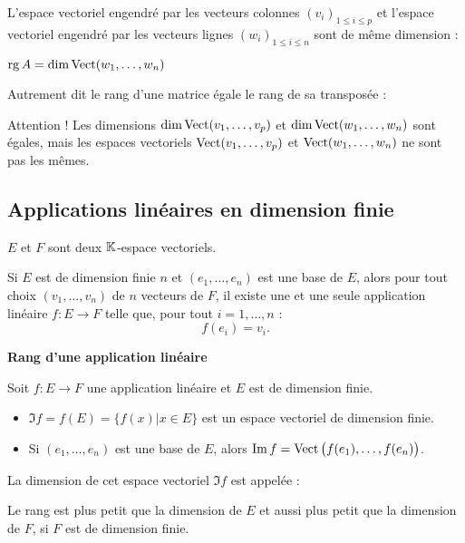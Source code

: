 \documentclass[10pt,class=article,crop=false]{standalone}
\begin{document}
\begin{multicols}{2}
L'espace vectoriel engendré par les vecteurs colonnes $(v_i)_{1 \le i \le p}$
	et l'espace vectoriel engendré par les vecteurs lignes $(w_i)_{1 \le i \le n}$ sont de même dimension :
\begin{proposition}
	$\operatorname{rg} A = \dim \operatorname{Vect} (w_1,\ldots,w_n)$
\end{proposition}

Autrement dit le rang d'une matrice égale le rang de sa transposée :

Attention ! Les dimensions $\dim \operatorname{Vect} (v_1,\ldots,v_p)$ et $\dim \operatorname{Vect} (w_1,\ldots,w_n)$
sont égales, mais les espaces vectoriels $\operatorname{Vect} (v_1,\ldots,v_p)$ et $\operatorname{Vect} (w_1,\ldots,w_n)$
ne sont pas les mêmes.


\subsection{Applications linéaires en dimension finie}

$E$ et $F$ sont deux $\mathbb{K}$-espace vectoriels.

\begin{theoreme}
Si $E$ est de dimension finie $n$
et $(e_1,\dots,e_n)$ est une base de $E$,
alors pour tout choix $(v_1, \ldots ,v_n)$
de $n$ vecteurs de $F$, il existe une et une seule application linéaire $f : E \to F$
telle que, pour tout $i=1,\ldots,n$ :
$$f(e_i)=v_i.$$
\end{theoreme}

\textbf{Rang d'une application linéaire}

Soit $f : E \to F$ une application linéaire et $E$ est de dimension finie.
\begin{itemize}
	\item $\Im f = f(E) = \big\{ f(x) | x \in E \big\}$ est un espace vectoriel de dimension finie.
	\item Si $(e_1,\ldots,e_n)$ est une base de $E$, alors
	$\mathop{\mathrm{Im}}\nolimits f = \operatorname{Vect} \big( f(e_1),\ldots,f(e_n) \big)$.
\end{itemize}
La dimension de cet espace vectoriel $\Im f$ est appelée  :

Le rang est plus petit que la dimension de $E$ et aussi plus petit
que la dimension de $F$, si $F$ est de dimension finie.



\end{multicols}
\end{document}
